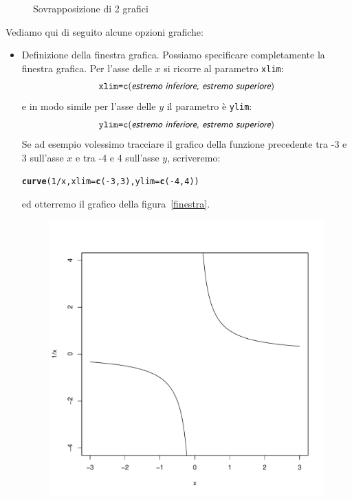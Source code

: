 \documentclass[onecolumn,11pt]{book}\usepackage[]{graphicx}\usepackage[]{color}
\makeatletter
\def\maxwidth{ %
  \ifdim\Gin@nat@width>\linewidth
    \linewidth
  \else
    \Gin@nat@width
  \fi
}
\newcommand{\hlnum}[1]{\textcolor[rgb]{0.686,0.059,0.569}{#1}}%
\newcommand{\hlopt}[1]{\textcolor[rgb]{0,0,0}{#1}}%
\newcommand{\hlstd}[1]{\textcolor[rgb]{0.345,0.345,0.345}{#1}}%
\newcommand{\hlkwc}[1]{\textcolor[rgb]{0.333,0.667,0.333}{#1}}%
\newcommand{\hlkwd}[1]{\textcolor[rgb]{0.737,0.353,0.396}{\textbf{#1}}}%
\newenvironment{kframe}{%
 \def\at@end@of@kframe{}%
 \ifinner\ifhmode%
  \def\at@end@of@kframe{\end{minipage}}%
  \begin{minipage}{\columnwidth}%
 \fi\fi%
 \def\FrameCommand##1{\hskip\@totalleftmargin \hskip-\fboxsep
 \colorbox{shadecolor}{##1}\hskip-\fboxsep
     \hskip-\linewidth \hskip-\@totalleftmargin \hskip\columnwidth}%
 \MakeFramed {\advance\hsize-\width
   \@totalleftmargin\z@ \linewidth\hsize
   \@setminipage}}%
 {\par\unskip\endMakeFramed%
 \at@end@of@kframe}
\newenvironment{knitrout}{}{} %
\newcommand{\varia}[1]{\textsl{\textsf{#1}}}
\makeatother
\begin{document}
\begin{itemize}
\begin{figure}[htbp]
\begin{center}
\begin{knitrout}
\end{knitrout}
\caption{Sovrapposizione di 2 grafici}
\label{addF}
\end{center}
\end{figure}
Vediamo qui di seguito alcune opzioni grafiche:
\begin{itemize}
\item{}Definizione della finestra grafica.\vskip0pt
Possiamo specificare completamente la finestra grafica.
Per l'asse delle $x$ si ricorre al parametro \texttt{xlim}: $$\texttt{xlim=c}(\varia{estremo inferiore, estremo superiore})$$
e in modo simile per l'asse delle $y$ il parametro \`e  \texttt{ylim}:$$\texttt{ylim=c}(\varia{estremo inferiore, estremo superiore})$$
Se ad esempio volessimo tracciare il grafico della funzione precedente  tra -3 e 3 sull'asse $x$ e tra -4 e 4 sull'asse $y$, scriveremo:
\begin{knitrout}
\color{fgcolor}\begin{kframe}
\begin{alltt}
\hlkwd{curve}\hlstd{(}\hlnum{1}\hlopt{/}\hlstd{x,}\hlkwc{xlim}\hlstd{=}\hlkwd{c}\hlstd{(} \hlopt{-}\hlnum{3}\hlstd{,}\hlnum{3}\hlstd{),} \hlkwc{ylim}\hlstd{=}\hlkwd{c}\hlstd{(}\hlopt{-}\hlnum{4}\hlstd{,}\hlnum{4}\hlstd{))}
\end{alltt}
\end{kframe}
\end{knitrout}
ed otterremo il grafico della figura~\ref{finestra}.
\begin{figure}[htbp]
\begin{center}
\begin{knitrout}
\color{fgcolor}
\includegraphics[width=\maxwidth]{figure/unnamed-chunk-73-1} 


\end{knitrout}
\end{center}
\end{figure}
\end{itemize}
\end{itemize}
\end{document}
